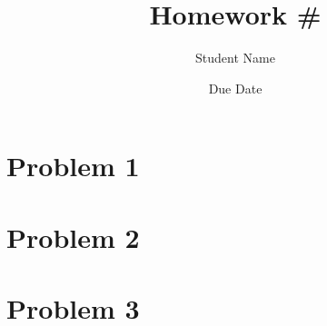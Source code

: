 \documentclass[12pt]{article}
\begin{document}
\title{Homework \#}
\author{Student Name}
\date{Due Date}
\maketitle

\section*{Problem 1}

\section*{Problem 2}

\section*{Problem 3}
\end{document}
